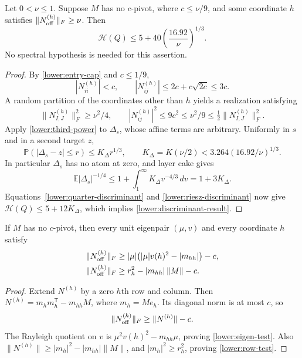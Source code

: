 \begin{theorem}\label{lower:discriminant}
Let $0<\nu\leq1$.  Suppose $M$ has no $c$-pivot, where
$c\leq\nu/9$, and some coordinate $h$ satisfies
$\|N^{(h)}_{\rm off}\|_F\geq\nu$.  Then
\begin{equation}\label{lower:discriminant-result}
 \mathcal H(Q)\leq5+40\left(\frac{16.92}{\nu}\right)^{1/3}.
\end{equation}
No spectral hypothesis is needed for this assertion.
\end{theorem}
\begin{proof}
By \eqref{lower:entry-cap} and $c\leq1/9$,
\[
 |N^{(h)}_{ii}|<c,
 \qquad |N^{(h)}_{ij}|
 \leq2c+c\sqrt{2c}\leq3c.
\]
A random partition of the coordinates other than $h$ yields a
realization satisfying
\[
 \|N^{(h)}_{I,J}\|_F^2\geq\nu^2/4,
 \qquad |N^{(h)}_{ij}|^2\leq9c^2\leq\nu^2/9
                          \leq\tfrac12\|N^{(h)}_{I,J}\|_F^2.
\]
Apply \eqref{lower:third-power} to $\Delta_s$, whose affine terms
are arbitrary.  Uniformly in $s$ and in a second target $z$,
\[
 \mathbb P(|\Delta_s-z|\leq r)\leq K_\Delta r^{1/3},
 \qquad
 K_\Delta=K(\nu/2)
 <3.264(16.92/\nu)^{1/3}.
\]
In particular $\Delta_s$ has no atom at zero, and layer cake gives
\[
 \mathbb E|\Delta_s|^{-1/4}
 \leq1+\int_1^\infty K_\Delta v^{-4/3}\,dv
 =1+3K_\Delta.
\]
Equations~\eqref{lower:quarter-discriminant} and
\eqref{lower:riesz-discriminant} now give
$\mathcal H(Q)\leq5+12K_\Delta$, which implies
\eqref{lower:discriminant-result}.
\end{proof}

\begin{lemma}\label{lower:tests}
If $M$ has no $c$-pivot, then every unit eigenpair $(\mu,v)$ and
every coordinate $h$ satisfy
\begin{align}
 \|N^{(h)}_{\rm off}\|_F
 &\geq |\mu|\bigl(|\mu|v(h)^2-|m_{hh}|\bigr)-c,
       \label{lower:eigen-test}\\
 \|N^{(h)}_{\rm off}\|_F
 &\geq r_h^2-|m_{hh}|\,\|M\|-c.
       \label{lower:row-test}
\end{align}
\end{lemma}
\begin{proof}
Extend $N^{(h)}$ by a zero $h$th row and column.  Then
$N^{(h)}=m_hm_h^{\mathsf T}-m_{hh}M$, where $m_h=Me_h$.
Its diagonal norm is at most $c$, so
\[
 \|N^{(h)}_{\rm off}\|_F\geq\|N^{(h)}\|-c.
\]
The Rayleigh quotient on $v$ is
$\mu^2v(h)^2-m_{hh}\mu$, proving \eqref{lower:eigen-test}.
Also $\|N^{(h)}\|\geq|m_h|^2-|m_{hh}|\|M\|$, and
$|m_h|^2\geq r_h^2$, proving \eqref{lower:row-test}.
\end{proof}

